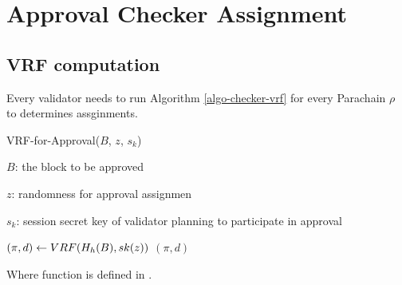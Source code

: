 \section{Approval Checker Assignment}
\subsection{VRF computation}

Every validator needs to run Algorithm \ref{algo-checker-vrf} for every Parachain $\rho$ to determines assginments.

\begin{algorithm}
  \caption[VRF-for-Approval]{\sc VRF-for-Approval($B$, $z$, $s_k$)}
  \label{algo-checker-vrf}
  \begin{algorithmic}[1]
  \Require

    $B$: the block to be approved 

    $z$: randomness for approval assignmen

    $s_k$: session secret key of validator planning to participate in approval

    \State $(\pi, d) \leftarrow \sc{VRF}(H_h(B),sk(z))$
    \State \Return $(\pi,d)$
  \end{algorithmic}
\end{algorithm}

\begin{algorithm}
  \Require{}
  \caption[]{\sc }
  \begin{algorithmic}[1]
    \State
  \end{algorithmic}
\end{algorithm}

Where  function is defined in \cite{polkadot-crypto-spec}.

